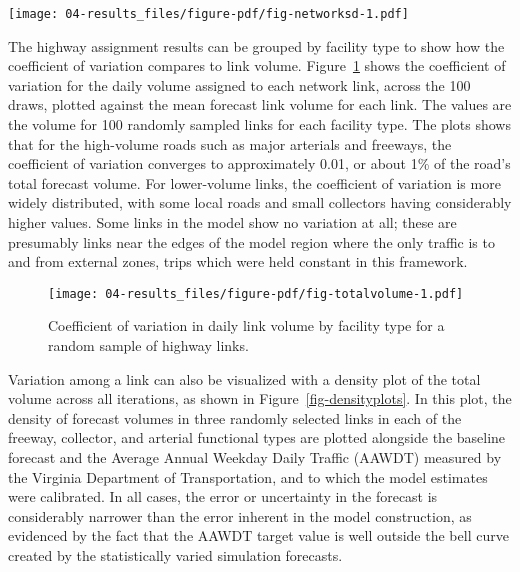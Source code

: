 \documentclass[
  letterpaper,
]{trb}
\begin{document}
\begin{sidewaysfigure}

{\centering \texttt{[image: 04-results\_files/figure-pdf/fig-networksd-1.pdf]}

}

\caption{\label{fig-networksd}Standard deviation in daily forecast
volume.}

\end{sidewaysfigure}

The highway assignment results can be grouped by facility type to show
how the coefficient of variation compares to link volume.
Figure~\ref{fig-totalvolume} shows the coefficient of variation for the
daily volume assigned to each network link, across the 100 draws,
plotted against the mean forecast link volume for each link. The values
are the volume for 100 randomly sampled links for each facility type.
The plots shows that for the high-volume roads such as major arterials
and freeways, the coefficient of variation converges to approximately
0.01, or about 1\% of the road's total forecast volume. For lower-volume
links, the coefficient of variation is more widely distributed, with
some local roads and small collectors having considerably higher values.
Some links in the model show no variation at all; these are presumably
links near the edges of the model region where the only traffic is to
and from external zones, trips which were held constant in this
framework.

\begin{figure}

{\centering \texttt{[image: 04-results\_files/figure-pdf/fig-totalvolume-1.pdf]}

}

\caption{\label{fig-totalvolume}Coefficient of variation in daily link
volume by facility type for a random sample of highway links.}

\end{figure}

Variation among a link can also be visualized with a density plot of the
total volume across all iterations, as shown in
Figure~\ref{fig-densityplots}. In this plot, the density of forecast
volumes in three randomly selected links in each of the freeway,
collector, and arterial functional types are plotted alongside the
baseline forecast and the Average Annual Weekday Daily Traffic (AAWDT)
measured by the Virginia Department of Transportation, and to which the
model estimates were calibrated. In all cases, the error or uncertainty
in the forecast is considerably narrower than the error inherent in the
model construction, as evidenced by the fact that the AAWDT target value
is well outside the bell curve created by the statistically varied
simulation forecasts.
\end{document}
